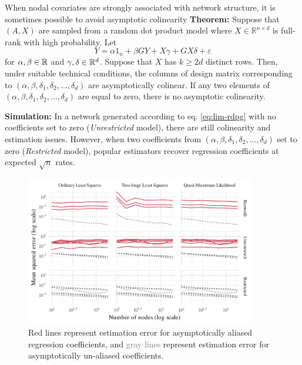 \documentclass[final]{beamer}
\newlength{\colwidth}
\begin{document}
\begin{frame}[t]
\begin{columns}[t]
\begin{column}{\colwidth}
\begin{block}{When nodal covariates are strongly associated with network structure, it is sometimes possible to avoid asymptotic colinearity}
                \textbf{Theorem:} Suppose that $(A, X)$ are sampled from a random dot product model where $X \in \mathbb{R}^{n \times d}$ is full-rank with high probability. Let
                \begin{equation} \label{eq:lim-rdpg}
                    Y = \alpha 1_n + \beta G Y + X \gamma + G X \delta + \varepsilon
                \end{equation}
                for $\alpha, \beta \in \mathbb{R}$ and $\gamma, \delta \in \mathbb{R}^d$. Suppose that $X$ has $k \ge 2d$ distinct rows. Then, under suitable technical conditions, the columns of design matrix corresponding to $(\alpha, \beta, \delta_1, \delta_2, \dots, \delta_d)$ are asymptotically colinear. If any two elements of $(\alpha, \beta, \delta_1, \delta_2, \dots, \delta_d)$ are equal to zero, there is no asymptotic colinearity.

                \textbf{Simulation:} In a network generated according to eq. \eqref{eq:lim-rdpg} with no coefficients set to zero (\emph{Unrestricted} model), there are still colinearity and estimation issues. However, when two coefficients from $(\alpha, \beta, \delta_1, \delta_2, \dots, \delta_d)$ set to zero (\emph{Restricted} model), popular estimators recover regression coefficients at expected $\sqrt{n}$ rates.

                \begin{figure}
                    \centering
                    \includegraphics[width=0.9\textwidth]{./figures/simulations/biometrika-mse-all.pdf}
                    \caption{\textcolor{Mahogany}{Red lines} represent estimation error for asymptotically aliased regression coefficients, and \textcolor{gray}{gray lines} represent estimation error for asymptotically un-aliased coefficients.}
                \end{figure}


\end{block}
\end{column}
\end{columns}
\end{frame}
\end{document}
